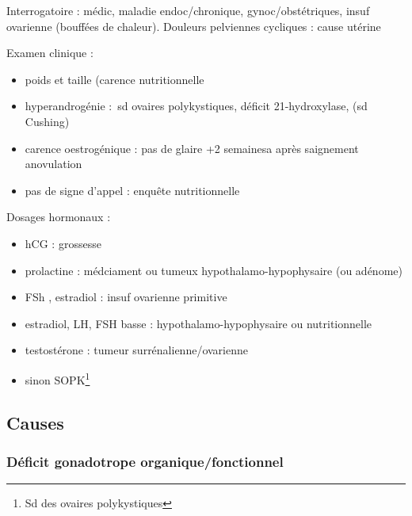 \documentclass[11pt]{article}
\begin{document}
Interrogatoire : médic, maladie endoc/chronique,
gynoc/obstétriques, insuf ovarienne (bouffées de chaleur). Douleurs pelviennes
cycliques : cause utérine

Examen clinique : 
\begin{itemize}
\item poids et taille (carence nutritionnelle
\item hyperandrogénie : sd ovaires polykystiques, déficit 21-hydroxylase, (sd
Cushing)
\item carence oestrogénique : pas de glaire +2 semainesa après saignement \thus
anovulation
\item pas de signe d'appel : enquête nutritionnelle
\end{itemize}

Dosages hormonaux :
\begin{itemize}
\item hCG : grossesse
\item prolactine \inc : médciament ou tumeux hypothalamo-hypophysaire (ou adénome)
\item FSh \inc, estradiol \dec : insuf ovarienne primitive
\item estradiol, LH, FSH basse : hypothalamo-hypophysaire ou nutritionnelle
\item testostérone : tumeur surrénalienne/ovarienne
\item sinon SOPK\footnote{Sd des ovaires polykystiques}
\end{itemize}

\subsection{Causes}
\label{sec:orgd857422}

\subsubsection{Déficit gonadotrope organique/fonctionnel}
\label{sec:org784244e}
\end{document}
